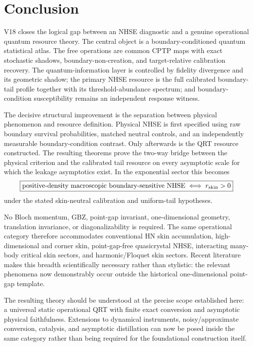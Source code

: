 \documentclass[11pt]{article}
\newcommand{\rskin}{r_{\rm skin}}
\begin{document}
\section{Conclusion}

V18 closes the logical gap between an NHSE diagnostic and a genuine operational quantum resource theory. The central object is a boundary-conditioned quantum statistical atlas. The free operations are common CPTP maps with exact stochastic shadows, boundary-non-creation, and target-relative calibration recovery. The quantum-information layer is controlled by fidelity divergence and its geometric shadow; the primary NHSE resource is the full calibrated boundary-tail profile together with its threshold-abundance spectrum; and boundary-condition susceptibility remains an independent response witness.

The decisive structural improvement is the separation between physical phenomenon and resource definition. Physical NHSE is first specified using raw boundary survival probabilities, matched neutral controls, and an independently measurable boundary-condition contrast. Only afterwards is the QRT resource constructed. The resulting theorems prove the two-way bridge between the physical criterion and the calibrated tail resource on every asymptotic scale for which the leakage asymptotics exist. In the exponential sector this becomes
\[
\boxed{
\text{positive-density macroscopic boundary-sensitive NHSE}
\iff
\rskin>0
}
\]
under the stated skin-neutral calibration and uniform-tail hypotheses.

No Bloch momentum, GBZ, point-gap invariant, one-dimensional geometry, translation invariance, or diagonalizability is required. The same operational category therefore accommodates conventional HN skin accumulation, high-dimensional and corner skin, point-gap-free quasicrystal NHSE, interacting many-body critical skin sectors, and harmonic/Floquet skin sectors. Recent literature makes this breadth scientifically necessary rather than stylistic: the relevant phenomena now demonstrably occur outside the historical one-dimensional point-gap template. \cite{Universal2D,QuasicrystalNHSE,ManyBodyCritical,HarmonicNHSE}

The resulting theory should be understood at the precise scope established here: a universal static operational QRT with finite exact conversion and asymptotic physical faithfulness. Extensions to dynamical instruments, noisy/approximate conversion, catalysis, and asymptotic distillation can now be posed inside the same category rather than being required for the foundational construction itself.
\end{document}
